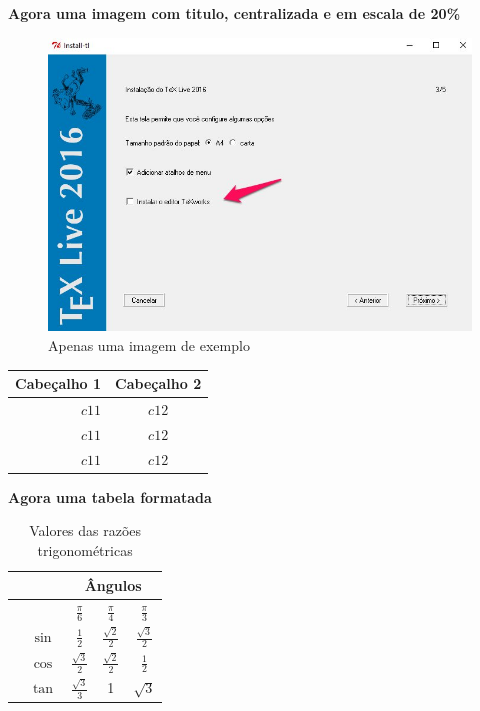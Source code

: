 \documentclass{article}
\begin{document}
\textbf{Agora uma imagem com titulo, centralizada e em escala de 20\%}

\begin{figure}[H]
  \centering
  \includegraphics[scale=0.2]{docs/texlive-install.jpg}
  \caption{Apenas uma imagem de exemplo}
  \label{fig:um_exemplo}
\end{figure}
	\centering
	\begin{tabular}{|r|c|}
		\hline
		Cabeçalho 1 & Cabeçalho 2 \\ \hline
		$c11$ & $c12$ \\ \hline
		$c11$ & $c12$ \\ \hline
		$c11$ & $c12$ \\ \hline	
	\end{tabular}



	
\centering
\textbf{Agora uma tabela formatada}

\begin{table}[H]
	\centering
	\begin{tabular}{>{\centering}m{2cm}cccc}
		\toprule[2pt]
		&  & \multicolumn{3}{c}{Ângulos} \\ 
		\cmidrule[.1pt]{3-5}
		&  & $\frac{\pi}{6}$ & $\frac{\pi}{4}$ & $\frac{\pi}{3}$ \\ 
		\cmidrule[.1pt]{2-5} 
		\multirow{3}{*}{\rotatebox[origin=c]{90}{\parbox{2.2cm}{\centering Razões\\ Trigonométricas}}} & $\sin$ & $\frac{1}{2}$ & $\frac{\sqrt{2}}{2}$ & $\frac{\sqrt{3}}{2}$ \\ 
		\cmidrule[.1pt]{2-5}
		& $\cos$ & $\frac{\sqrt{3}}{2}$ & $\frac{\sqrt{2}}{2}$ & $\frac{1}{2}$ \\ 
		\cmidrule[.1pt]{2-5}
		& $\tan$ & $\frac{\sqrt{3}}{3}$ & 1 & $\sqrt{3}$ \\ 
		\bottomrule[2pt]
	\end{tabular}
	\caption{Valores das razões trigonométricas}
\end{table}
\end{document}
